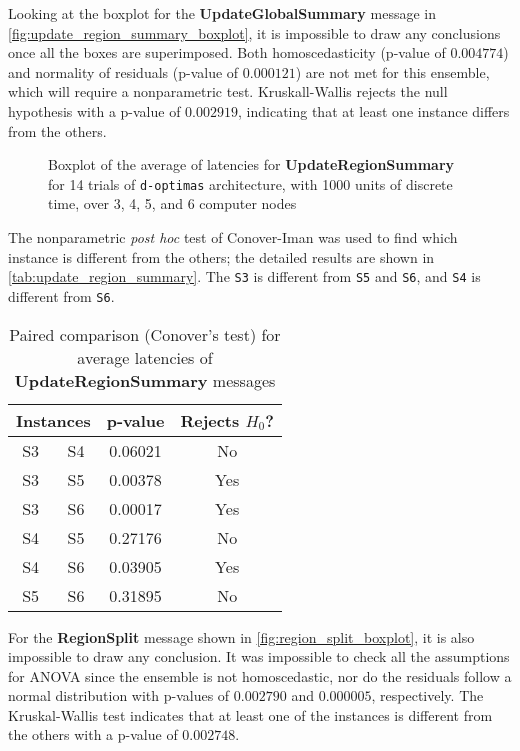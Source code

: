 \documentclass[preprint,12pt]{elsarticle}
\begin{document}
Looking at the boxplot for the \textbf{UpdateGlobalSummary} message in \autoref{fig:update_region_summary_boxplot}, it is impossible to draw any conclusions once all the boxes are superimposed. Both homoscedasticity (p-value of $0.004774$) and normality of residuals (p-value of $0.000121$) are not met for this ensemble, which will require a nonparametric test. Kruskall-Wallis rejects the null hypothesis with a p-value of $0.002919$, indicating that at least one instance differs from the others. 

\begin{figure}[ht!]
    \centering
    
    \caption{Boxplot of the average of latencies for \textbf{UpdateRegionSummary} for 14 trials of \texttt{d-optimas} architecture, with 1000 units of discrete time, over 3, 4, 5, and 6 computer nodes}
    \label{fig:update_region_summary_boxplot}
\end{figure}

The nonparametric \textit{post hoc} test of Conover-Iman was used to find which instance is different from the others; the detailed results are shown in \autoref{tab:update_region_summary}. The \texttt{S3} is different from \texttt{S5} and \texttt{S6}, and \texttt{S4} is different from \texttt{S6}.

\begin{table}[ht!]
    \centering
    \caption{Paired comparison (Conover's test) for average latencies of \textbf{UpdateRegionSummary} messages}
    \begin{tabular}{cccc}
    \toprule
    \multicolumn{2}{c}{\textbf{Instances}} & \textbf{p-value} & \textbf{Rejects $H_0$?}\\
    \midrule
     S3 &    S4 &  0.06021 &  No  \\
     S3 &    S5 &  0.00378 &  Yes \\
     S3 &    S6 &  0.00017 &  Yes \\
     S4 &    S5 &  0.27176 &  No  \\
     S4 &    S6 &  0.03905 &  Yes \\
     S5 &    S6 &  0.31895 &  No  \\
     \bottomrule
    \end{tabular}
    \label{tab:update_region_summary}
\end{table}

For the \textbf{RegionSplit} message shown in \autoref{fig:region_split_boxplot}, it is also impossible to draw any conclusion. It was impossible to check all the assumptions for ANOVA since the ensemble is not homoscedastic, nor do the residuals follow a normal distribution with p-values of $0.002790$ and $0.000005$, respectively. The Kruskal-Wallis test indicates that at least one of the instances is different from the others with a p-value of $0.002748$.
\end{document}
